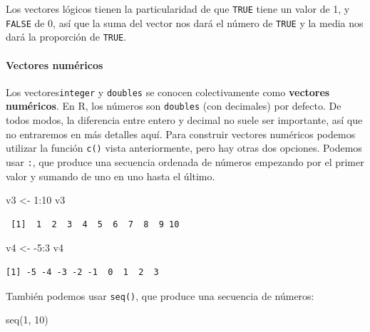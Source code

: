 \documentclass[
  letterpaper,
  DIV=11,
  numbers=noendperiod]{scrreprt}
\let\oldparagraph\paragraph
\renewcommand{\paragraph}[1]{\oldparagraph{#1}\mbox{}}
\newenvironment{Shaded}{\begin{snugshade}}{\end{snugshade}}
\newcommand{\DecValTok}[1]{\textcolor[rgb]{0.68,0.00,0.00}{#1}}
\newcommand{\FunctionTok}[1]{\textcolor[rgb]{0.28,0.35,0.67}{#1}}
\newcommand{\NormalTok}[1]{\textcolor[rgb]{0.00,0.23,0.31}{#1}}
\newcommand{\OtherTok}[1]{\textcolor[rgb]{0.00,0.23,0.31}{#1}}
\newcommand{\SpecialCharTok}[1]{\textcolor[rgb]{0.37,0.37,0.37}{#1}}
\begin{document}
Los vectores lógicos tienen la particularidad de que \texttt{TRUE} tiene
un valor de 1, y \texttt{FALSE} de 0, así que la suma del vector nos
dará el número de \texttt{TRUE} y la media nos dará la proporción de
\texttt{TRUE}.

\hypertarget{vectores-numuxe9ricos}{%
\paragraph{Vectores numéricos}\label{vectores-numuxe9ricos}}

Los vectores\texttt{integer} y \texttt{doubles} se conocen
colectivamente como \textbf{vectores numéricos}. En R, los números son
\texttt{doubles} (con decimales) por defecto. De todos modos, la
diferencia entre entero y decimal no suele ser importante, así que no
entraremos en más detalles aquí. Para construir vectores numéricos
podemos utilizar la función \texttt{c()} vista anteriormente, pero hay
otras dos opciones. Podemos usar \texttt{:}, que produce una secuencia
ordenada de números empezando por el primer valor y sumando de uno en
uno hasta el último.

\begin{Shaded}
\begin{Highlighting}[]
\NormalTok{v3 }\OtherTok{\textless{}{-}} \DecValTok{1}\SpecialCharTok{:}\DecValTok{10}
\NormalTok{v3}
\end{Highlighting}
\end{Shaded}

\begin{verbatim}
 [1]  1  2  3  4  5  6  7  8  9 10
\end{verbatim}

\begin{Shaded}
\begin{Highlighting}[]
\NormalTok{v4 }\OtherTok{\textless{}{-}} \SpecialCharTok{{-}}\DecValTok{5}\SpecialCharTok{:}\DecValTok{3}
\NormalTok{v4}
\end{Highlighting}
\end{Shaded}

\begin{verbatim}
[1] -5 -4 -3 -2 -1  0  1  2  3
\end{verbatim}

También podemos usar \texttt{seq()}, que produce una secuencia de
números:

\begin{Shaded}
\begin{Highlighting}[]
\FunctionTok{seq}\NormalTok{(}\DecValTok{1}\NormalTok{, }\DecValTok{10}\NormalTok{)}
\end{Highlighting}
\end{Shaded}
\end{document}
